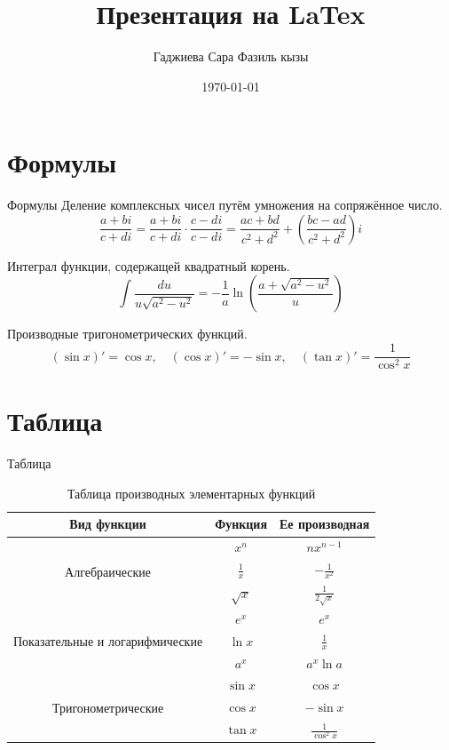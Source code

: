 \documentclass{beamer}
\title{Презентация на LaTex}
\author{Гаджиева Сара Фазиль кызы}
\date{\today}
\begin{document}
\begin{frame}
\titlepage
\end{frame}

\section{Формулы}
\begin{frame}{Формулы}
Деление комплексных чисел путём умножения на сопряжённое число.
\begin{equation}
\frac{a+bi}{c+di}=\frac{a+bi}{c+di}\cdot\frac{c-di}{c-di}=\frac{ac+bd}{c^2+d^2}+\left(\frac{bc-ad}{c^2+d^2}\right)i
\end{equation}

Интеграл функции, содержащей квадратный корень.
\begin{equation}
\int \frac{du}{u\sqrt{a^2-u^2}}=-\frac{1}{a}\ln\left(\frac{a+\sqrt{a^2-u^2}}{u}\right)
\end{equation}

Производные тригонометрических функций.
\begin{equation}
(\sin x)'=\cos x, \quad (\cos x)'=-\sin x, \quad (\tan x)'=\frac{1}{\cos^2 x}
\end{equation}

\end{frame}


\section{Таблица}
\begin{frame}{Таблица}
\begin{table}[!h]
\centering
\caption{Таблица производных элементарных функций}
\label{tab:1}
\vspace{15pt}
\begin{tabular}{|c|c|c|}
\hline
\textbf{Вид функции} & \textbf{Функция} & \textbf{Ее производная} \\
\hline
\multirow{3}{*}{Алгебраические} 
& $x^n$ & $nx^{n-1}$ \\ \cline{2-3}
& $\frac{1}{x}$ & $-\frac{1}{x^2}$ \\ \cline{2-3}
& $\sqrt{x}$ & $\frac{1}{2\sqrt{x}}$ \\
\hline
\multirow{3}{*}{Показательные и логарифмические}
& $e^x$ & $e^x$ \\ \cline{2-3}
& $\ln x$ & $\frac{1}{x}$ \\ \cline{2-3}
& $a^x$ & $a^x \ln a$ \\
\hline
\multirow{3}{*}{Тригонометрические}
& $\sin x$ & $\cos x$ \\ \cline{2-3}
& $\cos x$ & $-\sin x$ \\ \cline{2-3}
& $\tan x$ & $\frac{1}{\cos^2 x}$ \\
\hline
\end{tabular}
\end{table}
\end{frame}
\end{document}
